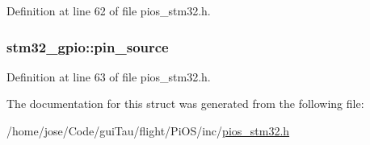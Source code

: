 Definition at line 62 of file pios\-\_\-stm32.\-h.

\hypertarget{structstm32__gpio_a79c5a3ec6b45fc1a2c4921c81f79ca42}{
\subsubsection[{pin\-\_\-source}]{ stm32\-\_\-gpio\-::pin\-\_\-source}}\label{structstm32__gpio_a79c5a3ec6b45fc1a2c4921c81f79ca42}


Definition at line 63 of file pios\-\_\-stm32.\-h.



The documentation for this struct was generated from the following file\-:\begin{DoxyCompactItemize}
\item 
/home/jose/\-Code/gui\-Tau/flight/\-Pi\-O\-S/inc/\hyperlink{pios__stm32_8h}{pios\-\_\-stm32.\-h}\end{DoxyCompactItemize}
